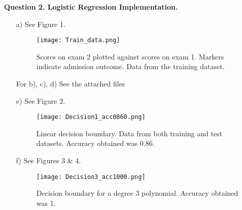 \documentclass[12pt]{article}
\begin{document}
\noindent\textbf{Question 2. Logistic Regression Implementation. }
\begin{enumerate}
    \item[a)] See Figure 1.
    \begin{figure}[h]
        \centering
        \texttt{[image: Train\_data.png]}
        \caption{Scores on exam 2 plotted against scores on exam 1. Markers indicate admission outcome. Data from the training dataset.}
    \end{figure}
    \item[For] b), c), d) See the attached files
    \item[e)] See Figure 2.
    \begin{figure}[h]
        \centering
        \texttt{[image: Decision1\_acc0860.png]}
        \caption{Linear decision boundary. Data from both training and test datasets. Accuracy obtained was 0.86.}
    \end{figure}
    \item[f)] See Figures 3 \& 4.
    \begin{figure}[h]
        \centering
        \texttt{[image: Decision3\_acc1000.png]}
        \caption{Decision boundary for a degree 3 polynomial. Accuracy obtained was 1.}
    \end{figure}
\end{enumerate}
\end{document}
